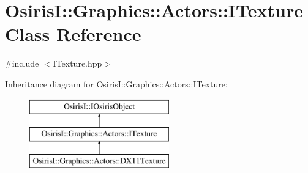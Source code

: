 \hypertarget{class_osiris_i_1_1_graphics_1_1_actors_1_1_i_texture}{\section{Osiris\-I\-:\-:Graphics\-:\-:Actors\-:\-:I\-Texture Class Reference}
\label{class_osiris_i_1_1_graphics_1_1_actors_1_1_i_texture}
}


{\ttfamily \#include $<$I\-Texture.\-hpp$>$}

Inheritance diagram for Osiris\-I\-:\-:Graphics\-:\-:Actors\-:\-:I\-Texture\-:\begin{figure}[H]
\begin{center}
\leavevmode
\includegraphics[height=3.000000cm]{class_osiris_i_1_1_graphics_1_1_actors_1_1_i_texture}
\end{center}
\end{figure}
